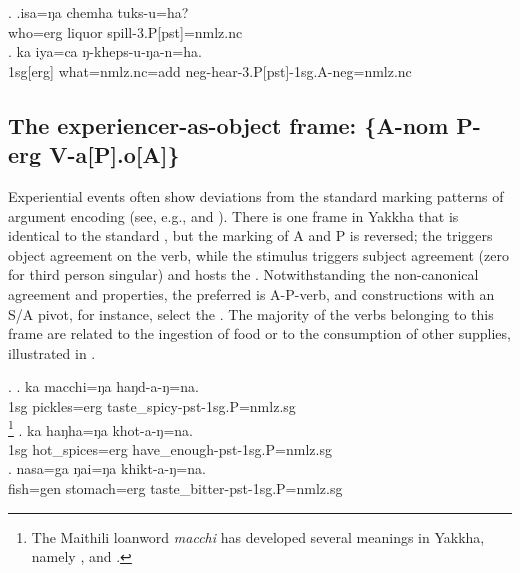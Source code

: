  \ex. \ag.isa=ŋa chemha tuks-u=ha?\\
		who{\sc =erg} liquor spill{\sc -3.P[pst]=nmlz.nc}\\
 \bg. ka iya=ca ŋ-kheps-u-ŋa-n=ha.\\
  {\sc 1sg[erg]} what{\sc =nmlz.nc=add}  {\sc neg}-hear-{\sc 3.P[pst]-1sg.A-neg=nmlz.nc}\\
 
\subsection[The experiencer-as-object frame]{The experiencer-as-object frame: \{A-{\sc nom} P-{\sc erg} V-a[P].o[A]\}}\label{tr-objex}


\noindent
Experiential events often show deviations from the standard marking patterns of argument encoding (see, e.g.,  \citealt{Bhaskararao2004_Nonnominative} and  \citealt{Malchukov2008Split}). There is one frame in Yakkha that is identical to the standard , but the marking of A and P is reversed;  the  triggers object agreement on the verb, while the stimulus triggers subject agreement (zero for third person singular) and hosts the   . Notwithstanding the non-canonical agreement and  properties, the preferred  is A-P-verb, and constructions with an S/A pivot, for instance, select the . The majority of the verbs belonging to this frame are related  to the ingestion of food or to the consumption of other supplies, illustrated in \Next.

\ex. \ag. ka macchi=ŋa haŋd-a-ŋ=na.\\
		{\sc 1sg} pickles{\sc =erg} taste\_spicy{\sc -pst-1sg.P=nmlz.sg}\\
		\footnote{The Maithili loanword \emph{macchi} has developed several meanings in Yakkha, namely ,  and .}
	\bg. ka haŋha=ŋa khot-a-ŋ=na.\\	
		{\sc 1sg} hot\_spices{\sc =erg} have\_enough{\sc -pst-1sg.P=nmlz.sg}\\
	\bg. nasa=ga ŋai=ŋa khikt-a-ŋ=na.\\ 
		fish{\sc =gen} stomach{\sc =erg} taste\_bitter{\sc -pst-1sg.P=nmlz.sg}\\
	
